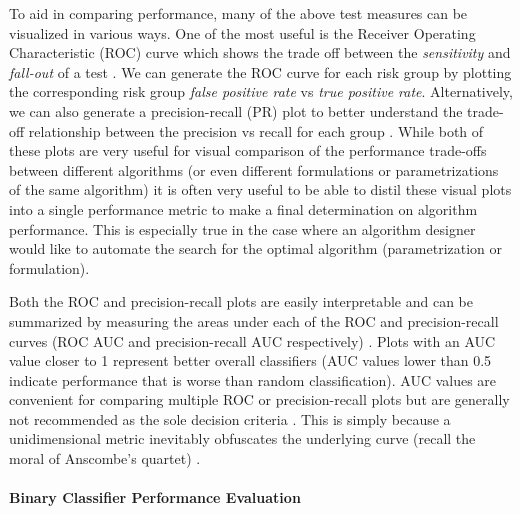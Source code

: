 \documentclass[]{article}
\begin{document}
To aid in comparing performance, many of the above test measures can be visualized in various ways. One of the most useful is the Receiver Operating Characteristic (ROC) curve which shows the trade off between the \textit{sensitivity} and \textit{fall-out} of a test \cite{Davis2006,Sayad,Fieldsend2005,Flach2004,MedCalc2017,Gung2013}. We can generate the ROC curve for each risk group by plotting the corresponding risk group \textit{false positive rate} vs \textit{true positive rate}. Alternatively, we can also generate a precision-recall (PR) plot to better understand the trade-off relationship between the precision vs recall for each group \cite{Davis2006,Flach2004,MedCalc2017,Gung2013}. While both of these plots are very useful for visual comparison of the performance trade-offs between different algorithms (or even different formulations or parametrizations of the same algorithm) it is often very useful to be able to distil these visual plots into a single performance metric to make a final determination on algorithm performance. This is especially true in the case where an algorithm designer would like to automate the search for the optimal algorithm (parametrization or formulation).

Both the ROC and precision-recall plots are easily interpretable and can be summarized by measuring the areas under each of the ROC and precision-recall curves (ROC AUC and precision-recall AUC respectively) \cite{Davis2006,Flach2004,MedCalc2017,Sayad}. Plots with an AUC value closer to 1 represent better overall classifiers (AUC values lower than 0.5 indicate performance that is worse than random classification). AUC values are convenient for comparing multiple ROC or precision-recall plots but are generally not recommended as the sole decision criteria \cite{Davis2006,Flach2004,MedCalc2017,Sayad}. This is simply because a unidimensional metric inevitably obfuscates the underlying curve (recall the moral of Anscombe's quartet) \cite{Anscombe1973}.

\paragraph{Binary Classifier Performance Evaluation}
\end{document}
